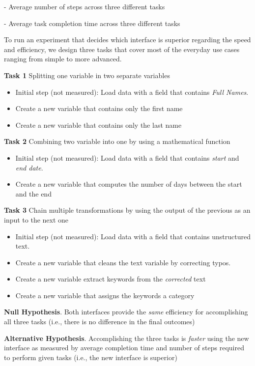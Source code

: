 \documentclass[12pt,letterpaper]{article}
\begin{document}
\hspace{20mm} - Average number of steps across three different tasks 


\hspace{20mm} - Average task completion time across three different tasks

To run an experiment that decides which interface is superior regarding the speed and efficiency, we design three tasks that cover most of the everyday use cases ranging from simple to more advanced. 

\textbf{Task 1} Splitting one variable in two separate variables
\begin{itemize}
    \item Initial step (not measured): Load data with a field that contains \textit{Full Names}. 
    \item Create a new variable that contains only the first name
    \item Create a new variable that contains only the last name
\end{itemize}

\textbf{Task 2} Combining two variable into one by using a mathematical function
\begin{itemize}
    \item Initial step (not measured): Load data with a field that contains \textit{start} and \textit{end date}. 
    \item Create a new variable that computes the number of days between the start and the end
\end{itemize}

\textbf{Task 3} Chain multiple transformations by using the output of the previous as an input to the next one
\begin{itemize}
    \item Initial step (not measured): Load data with a field that contains unstructured text. 
    \item Create a new variable that cleans the text variable by correcting typos.
    \item Create a new variable extract keywords from the \textit{corrected} text
    \item Create a new variable that assigns the keywords a category
\end{itemize}


\textbf{Null Hypothesis}. Both interfaces provide the \textit{same} efficiency for accomplishing all three tasks (i.e., there is no difference in the final outcomes)

\textbf{Alternative Hypothesis}. Accomplishing the three tasks is \textit{faster} using the new interface as measured by average completion time and number of steps required to perform given tasks (i.e., the new interface is superior)
\end{document}
